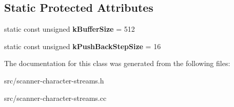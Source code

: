 \subsection*{Static Protected Attributes}
\begin{DoxyCompactItemize}
\item 
\hypertarget{classv8_1_1internal_1_1_buffered_utf16_character_stream_ab492f005bfd4cd5ce91e9ff0aa41e2b0}{}static const unsigned {\bfseries k\+Buffer\+Size} = 512\label{classv8_1_1internal_1_1_buffered_utf16_character_stream_ab492f005bfd4cd5ce91e9ff0aa41e2b0}

\item 
\hypertarget{classv8_1_1internal_1_1_buffered_utf16_character_stream_a60305f04307c3b129b492c1f31c0e648}{}static const unsigned {\bfseries k\+Push\+Back\+Step\+Size} = 16\label{classv8_1_1internal_1_1_buffered_utf16_character_stream_a60305f04307c3b129b492c1f31c0e648}

\end{DoxyCompactItemize}


The documentation for this class was generated from the following files\+:\begin{DoxyCompactItemize}
\item 
src/scanner-\/character-\/streams.\+h\item 
src/scanner-\/character-\/streams.\+cc\end{DoxyCompactItemize}
